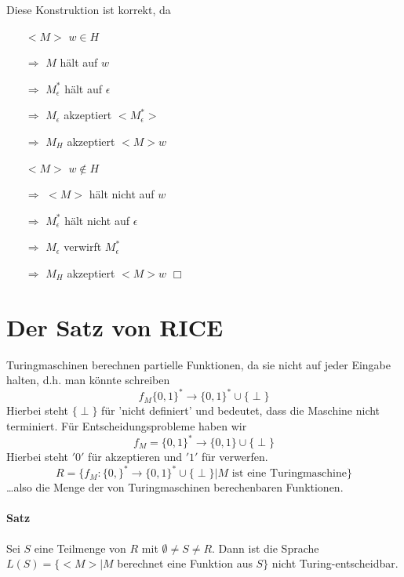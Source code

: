 \par\medskip Diese Konstruktion ist korrekt, da \par\medskip
\begin{itemize}
	\item[$<M>$] $w \in H$
	\item[$\Rightarrow$] $M$ hält auf $w$
	\item[$\Rightarrow$] $M_\epsilon^*$ hält auf $\epsilon$
	\item[$\Rightarrow$] $M_\epsilon$ akzeptiert $<M_\epsilon^*>$
	\item[$\Rightarrow$] $M_H$ akzeptiert $<M>w$
	
	\item[$<M>$] $w \not\in H$
	\item[$\Rightarrow$] $<M>$ hält nicht auf $w$
	\item[$\Rightarrow$] $M_\epsilon^*$ hält nicht auf $\epsilon$
	\item[$\Rightarrow$] $M_\epsilon$ verwirft $M_\epsilon^*$
	\item[$\Rightarrow$] $M_H$ akzeptiert $<M>w$ \hspace{1cm} $\Box$
\end{itemize}


\section{Der Satz von RICE}

Turingmaschinen berechnen partielle Funktionen, da sie nicht auf jeder Eingabe halten, d.h. man könnte schreiben $$ f_M\{0,1\}^* \rightarrow \{0,1\}^*\cup\{\perp\} $$ Hierbei steht $\{\perp\}$ für 'nicht definiert' und bedeutet, dass die Maschine nicht terminiert. Für Entscheidungsprobleme haben wir $$ f_M=\{0,1\}^* \rightarrow \{0,1\}\cup\{\perp\}$$ Hierbei steht $'0'$ für akzeptieren und $'1'$ für verwerfen. $$ R=\{  f_M:\{0,\}^* \rightarrow \{0,1\}^*\cup\{\perp\}|M \text{ ist eine Turingmaschine}\} $$ \dots also die Menge der von Turingmaschinen berechenbaren Funktionen.

\paragraph*{Satz} Sei $S$ eine Teilmenge von $R$ mit $\emptyset\not=S\not=R$. Dann ist die Sprache $L(S)=\{<M>|M$ berechnet eine Funktion aus $S\}$ nicht Turing-entscheidbar.

